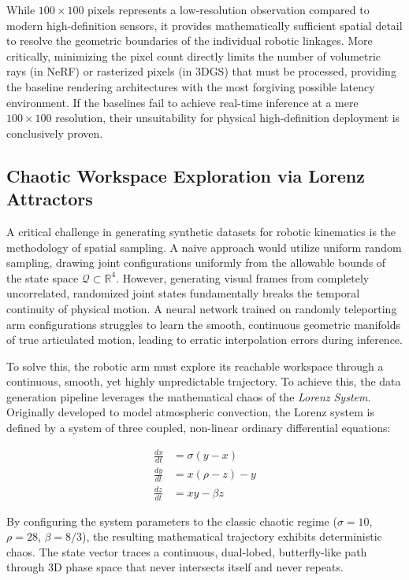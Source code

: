 \documentclass[12pt,a4paper,oneside]{report}
\begin{document}
While $100 \times 100$ pixels represents a low-resolution observation compared to modern high-definition sensors, it provides mathematically sufficient spatial detail to resolve the geometric boundaries of the individual robotic linkages. More critically, minimizing the pixel count directly limits the number of volumetric rays (in NeRF) or rasterized pixels (in 3DGS) that must be processed, providing the baseline rendering architectures with the most forgiving possible latency environment. If the baselines fail to achieve real-time inference at a mere $100 \times 100$ resolution, their unsuitability for physical high-definition deployment is conclusively proven.

\subsection{Chaotic Workspace Exploration via Lorenz Attractors}

A critical challenge in generating synthetic datasets for robotic kinematics is the methodology of spatial sampling. A naive approach would utilize uniform random sampling, drawing joint configurations uniformly from the allowable bounds of the state space $\mathcal{Q} \subset \mathbb{R}^4$. However, generating visual frames from completely uncorrelated, randomized joint states fundamentally breaks the temporal continuity of physical motion. A neural network trained on randomly teleporting arm configurations struggles to learn the smooth, continuous geometric manifolds of true articulated motion, leading to erratic interpolation errors during inference.

To solve this, the robotic arm must explore its reachable workspace through a continuous, smooth, yet highly unpredictable trajectory. To achieve this, the data generation pipeline leverages the mathematical chaos of the \textit{Lorenz System}. Originally developed to model atmospheric convection, the Lorenz system is defined by a system of three coupled, non-linear ordinary differential equations:

\begin{align}
\frac{dx}{dt} &= \sigma (y - x) \\
\frac{dy}{dt} &= x (\rho - z) - y \\
\frac{dz}{dt} &= x y - \beta z
\end{align}

By configuring the system parameters to the classic chaotic regime ($\sigma = 10$, $\rho = 28$, $\beta = 8/3$), the resulting mathematical trajectory exhibits deterministic chaos. The state vector traces a continuous, dual-lobed, butterfly-like path through 3D phase space that never intersects itself and never repeats.
\end{document}
